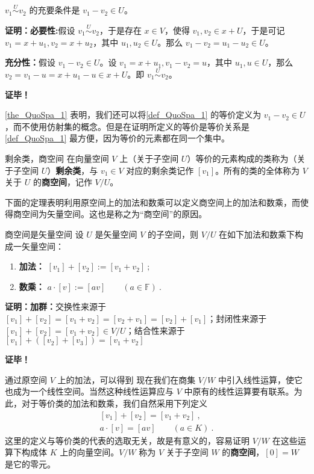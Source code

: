 \begin{theorem}{}\label{the_QuoSpa_1}
 $v_1\overset{U}{\sim} v_2$ 的充要条件是 $v_1-v_2\in U$。
\end{theorem}
\textbf{证明：}\textbf{必要性:}假设 $v_1\overset{U}{\sim} v_2$，于是存在 $x\in V$，使得 $v_1,v_2\in x+U$，于是可记 $v_1=x+u_1,v_2=x+u_2$，其中 $u_1,u_2\in U$。那么 $v_1-v_2=u_1-u_2\in U$。

\textbf{充分性：}假设 $v_1-v_2\in U$。设 $v_1=x+u_1,v_1-v_2=u$，其中 $u_1,u\in U$，那么 $v_2=v_1-u=x+u_1-u\in x+U$。即 $v_1\overset{U}{\sim} v_2$。

\textbf{证毕！}

\autoref{the_QuoSpa_1} 表明，我们还可以将\autoref{def_QuoSpa_1} 的等价定义为 $v_1-v_2\in U$，而不使用仿射集的概念。但是在证明所定义的等价是等价关系是\autoref{def_QuoSpa_1} 最方便，因为等价的元素都在同一个集中。
\begin{definition}{剩余类，商空间}
在向量空间 $V$ 上（关于子空间 $U$）等价的元素构成的类称为（关于子空间 $U$）\textbf{剩余类}，与 $v_1\in V$ 对应的剩余类记作 $[v_1]$。所有的类的全体称为 $V$ 关于 $U$ 的\textbf{商空间}，记作 $V/U$。
\end{definition}

下面的定理表明利用原空间上的加法和数乘可以定义商空间上的加法和数乘，而使得商空间为矢量空间。这也是称之为“商空间”的原因。

\begin{theorem}{商空间是矢量空间}
设 $U$ 是矢量空间 $V$ 的子空间，则 $V/U$ 在如下加法和数乘下构成一矢量空间：
\begin{enumerate}
\item \textbf{加法：}
$[v_1] + [v_2] := [v_1 + v_2]~;$
\item \textbf{数乘：} $a \cdot [v] := [a v]\qquad (a \in \mathbb F)~.$
\end{enumerate}
\end{theorem}

\textbf{证明：}\textbf{加群：}交换性来源于 $[v_1] + [v_2]= [v_1 + v_2]=[v_2+v_1]=[v_2] + [v_1]$；封闭性来源于 $[v_1]+[v_2]=[v_1+v_2]\in V/U$；结合性来源于 $[v_1] + ([v_2]+[v_3])= [v_1 + v_2]$


\textbf{证毕！}


通过原空间 $V$ 上的加法，可以得到
现在我们在商集 $V / W$ 中引入线性运算，使它也成为一个线性空间。当然这种线性运算应与 $V$ 中原有的线性运算要有联系。为此，对于等价类的加法和数乘，我们自然采用下列定义
\begin{equation}
\begin{array}{l}
[v_1] + [v_2] = [v_1 + v_2]~, \\
a \cdot [v] = [a v]\qquad (a \in K)~.
\end{array}
\end{equation}
这里的定义与等价类的代表的选取无关，故是有意义的，容易证明 $V/W $ 在这些运算下构成体 $K $ 上的向量空间。$V/W $ 称为 $V$ 关于子空间 $W$ 的\textbf{商空间}，$[0] = W$ 是它的零元。

